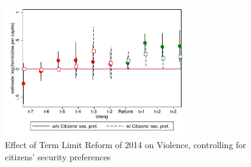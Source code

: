 \documentclass{beamer}
\begin{document}
\begin{frame}[label=citizens_preferences, noframenumbering]
\begin{table}[htbp]
{\begin{tabular}{lcccc}
\end{tabular}
}
\end{table}
  \hyperlink{alternative_explanations}{} 

	
\end{frame}
 
\begin{frame}[label=citizens_preferences_log, noframenumbering]

\begin{figure}[H]
\centering
\caption{Effect of Term Limit Reform of 2014 on Violence, controlling for citizens' security preferences}
  \label{fig:citizens_preferences_log} 

 \includegraphics[width=0.7\textwidth]{Figures_pres/citizens_preferences_log.pdf}
     \captionsetup{justification=centering}  
        
\end{figure}  
  \hyperlink{alternative_explanations}{} 


\end{frame}
\end{document}
